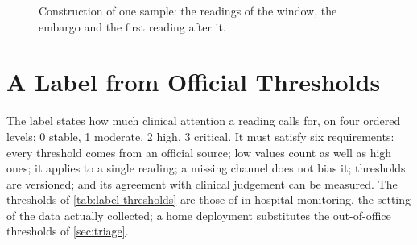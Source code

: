 \begin{figure}[htbp]
\centering
{}
\caption{Construction of one sample: the readings of the window, the embargo and the first reading after it.}\label{fig:window-embargo}
\end{figure}

\section{A Label from Official Thresholds}\label{sec:labelling}\label{sec:label-rules}

The label states how much clinical attention a reading calls for, on four ordered levels: 0 stable, 1 moderate, 2 high, 3 critical. It must satisfy six requirements: every threshold comes from an official source; low values count as well as high ones; it applies to a single reading; a missing channel does not bias it; thresholds are versioned; and its agreement with clinical judgement can be measured. The thresholds of \cref{tab:label-thresholds} are those of in-hospital monitoring, the setting of the data actually collected; a home deployment substitutes the out-of-office thresholds of \cref{sec:triage}.

